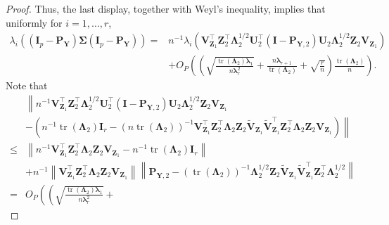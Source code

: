 \documentclass[12pt]{article} %
\DeclareMathOperator{\mytr}{tr}
\newcommand{\bZ}{\mathbf{Z}}
\newcommand{\bP}{\mathbf{P}}
\newcommand{\bY}{\mathbf{Y}}
\newcommand{\bI}{\mathbf{I}}
\newcommand{\bU}{\mathbf{U}}
\newcommand{\bV}{\mathbf{V}}
\newcommand{\bfsym}[1]{\ensuremath{\boldsymbol{#1}}}
\def\blambda {\bfsym {\lambda}}
\def\bLambda {\bfsym {\Lambda}}
\def\bSigma {\bfsym {\Sigma}}
\theoremstyle{definition}
\begin{document}
\begin{appendices}
\begin{proof}
         Thus, the last display, together with Weyl's inequality, implies that uniformly for $i=1,\ldots, r$,
\begin{equation*}
    \begin{split}
    \lambda_i\left(
             (\bI_p -\bP_\bY)\bSigma (\bI_p- \bP_{\bY})
         \right)
             =&
             n^{-1}\lambda_i\left(
                  \bV_{\bZ_1}^\top \bZ_2^\top \bLambda_2^{1/2} \bU_2^\top (\bI-\bP_{\bY,2}) \bU_2 \bLambda_2^{1/2} \bZ_2 \bV_{\bZ_1}
              \right)
              \\
             &+O_P\left(
                 \left(
                     \sqrt{\frac{\mytr(\bLambda_2)\blambda_1}{n\blambda_r^2}}  
                     +\frac{n\blambda_{r+1}}{\mytr(\bLambda_2)}
                     +\sqrt{\frac{r}{n}}
                 \right)
             \frac{\mytr(\bLambda_2)}{n}\right).
    \end{split}
\end{equation*}
Note that
\begin{equation*}
    \begin{split}
                  &\left\|
                  n^{-1}\bV_{\bZ_1}^\top \bZ_2^\top \bLambda_2^{1/2} \bU_2^\top (\bI-\bP_{\bY,2}) \bU_2 \bLambda_2^{1/2} \bZ_2 \bV_{\bZ_1}
              \right.
              \\
              &\left.
                  -\left(
                      n^{-1}\mytr(\bLambda_2)\bI_r
                  -
            \left(n\mytr(\bLambda_2)\right)^{-1}
            \bV_{\bZ_1}^\top \bZ_2^\top \bLambda_2\bZ_{2} \tilde{\bV}_{\bZ_1}
            \tilde{\bV}_{\bZ_1}^\top \bZ_2^\top \bLambda_2 \bZ_2 \bV_{\bZ_1}
                  \right)
                  \right\|
                  \\
                  \leq&
                  \left\|n^{-1}\bV_{\bZ_1}^\top \bZ_2^\top \bLambda_2 \bZ_2 \bV_{\bZ_1}-
                      n^{-1}\mytr(\bLambda_2)\bI_r
                  \right\|
                  \\
                  &+
                  n^{-1}\left\|\bV_{\bZ_1}^\top \bZ_2^\top \bLambda_2 \bZ_2 \bV_{\bZ_1}\right\|
            \left\|\bP_{\bY,2}-
            \left(\mytr(\bLambda_2)\right)^{-1}
            \bLambda_2^{1/2}\bZ_{2} \tilde{\bV}_{\bZ_1}
            \tilde{\bV}_{\bZ_1}^\top \bZ_2^\top \bLambda_2^{1/2}
            \right\|
            \\
            =& O_P\left(
                \left(
                    \sqrt{\frac{\mytr(\bLambda_2)\blambda_1}{n\blambda_r^2}}
                    +

\end{split}
\end{equation*}
\end{proof}
\end{appendices}
\end{document}
